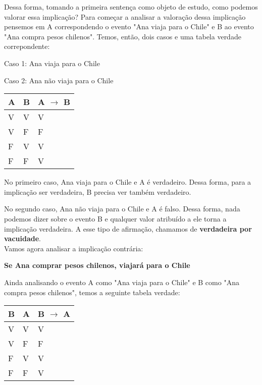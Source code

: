 Dessa forma, tomando a primeira sentença como objeto de estudo, como podemos valorar essa implicação?
Para começar a analisar a valoração dessa implicação pensemos em A correspondendo o evento "Ana viaja para o Chile" e B ao evento "Ana compra pesos chilenos". Temos, então, dois casos e uma tabela verdade correpondente:

\begin{center}

Caso 1: Ana viaja para o Chile 

Caso 2: Ana não viaja para o Chile

\end{center}

\begin{table}[htb]
\centering
\begin{tabular}{|l|l|l|}
\hline

\textbf{A} & \textbf{B} & \textbf{A $\to$ B} \\ \hline
V          & V          & V                  \\ \hline
V          & F          & F                  \\ \hline
F          & V          & V                  \\ \hline
F          & F          & V                  \\ \hline

\end{tabular}
\end{table}

No primeiro caso, Ana viaja para o Chile e A é verdadeiro. Dessa forma, para a implicação ser verdadeira, B precisa ver também verdadeiro.

No segundo caso, Ana não viaja para o Chile e A é falso.
Dessa forma, nada podemos dizer sobre o evento B e qualquer valor atribuído a ele torna a implicação verdadeira. A esse tipo de afirmação, chamamos de \textbf{verdadeira por vacuidade}.\\

Vamos agora analisar a implicação contrária:
\begin{center}

\textbf{Se Ana comprar pesos chilenos, viajará para o Chile}

\end{center}
Ainda analisando o evento A como "Ana viaja para o Chile" e B como "Ana compra pesos chilenos", temos a seguinte tabela verdade:

\begin{table}[htb]
\centering
\begin{tabular}{|l|l|l|}
\hline

\textbf{B} & \textbf{A} & \textbf{B $\to$ A} \\ \hline
V          & V          & V                  \\ \hline
V          & F          & F                  \\ \hline
F          & V          & V                  \\ \hline
F          & F          & V                  \\ \hline

\end{tabular}
\end{table}


